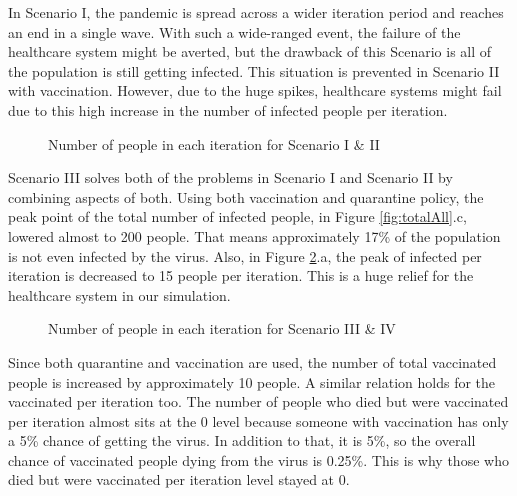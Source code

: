 \documentclass{article}
\begin{document}
In Scenario I, the pandemic is spread across a wider iteration period and reaches an end in a single wave. With such a wide-ranged event, the failure of the healthcare system might be averted, but the drawback of this Scenario is all of the population is still getting infected. This situation is prevented in Scenario II with vaccination. However, due to the huge spikes, healthcare systems might fail due to this high increase in the number of infected people per iteration.

\begin{figure}[h]
    \centering
    \qquad
    \caption{Number of people in each iteration for Scenario I \& II}
    \label{fig:perIter1&2}%
\end{figure}

Scenario III solves both of the problems in Scenario I and Scenario II by combining aspects of both. Using both vaccination and quarantine policy, the peak point of the total number of infected people, in Figure \ref{fig:totalAll}.c, lowered almost to 200 people. That means approximately 17\% of the population is not even infected by the virus. Also, in Figure \ref{fig:perIter3&4}.a, the peak of infected per iteration is decreased to 15 people per iteration. This is a huge relief for the healthcare system in our simulation.

\newpage

\begin{figure}[h]
    \centering
    \qquad
    \caption{Number of people in each iteration for Scenario III \& IV}
    \label{fig:perIter3&4}%
\end{figure}

Since both quarantine and vaccination are used, the number of total vaccinated people is increased by approximately 10 people. A similar relation holds for the vaccinated per iteration too. The number of people who died but were vaccinated per iteration almost sits at the 0 level because someone with vaccination has only a 5\% chance of getting the virus. In addition to that, it is 5\%, so the overall chance of vaccinated people dying from the virus is 0.25\%. This is why those who died but were vaccinated per iteration level stayed at 0.
\end{document}
